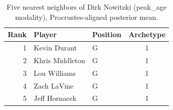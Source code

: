 \begin{table}[htbp]
  \centering\small
  \begin{tabular}{rllc}
    \toprule
    Rank & Player & Position & Archetype \\
    \midrule
    1 & Kevin Durant & G & 1 \\
    2 & Khris Middleton & G & 1 \\
    3 & Lou Williams & G & 1 \\
    4 & Zach LaVine & G & 1 \\
    5 & Jeff Hornacek & G & 1 \\
    \bottomrule
  \end{tabular}
  \caption{Five nearest neighbors of Dirk Nowitzki (peak_age modality), Procrustes-aligned posterior mean.}
  \label{tab:Dirk_Nowitzki_neighbors_peak_age}
\end{table}

